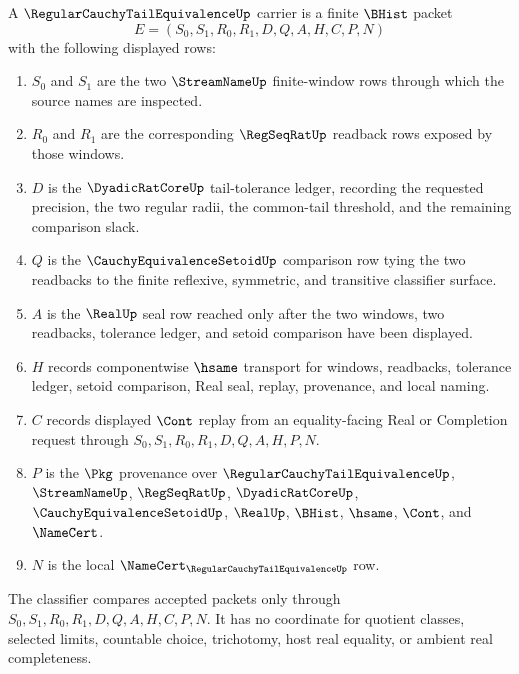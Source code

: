 \begin{definition}
\label{def:regular-cauchy-tail-equivalence-carrier}
A $\RegularCauchyTailEquivalenceUp$ carrier is a finite $\BHist$ packet
$$
E=(S_0,S_1,R_0,R_1,D,Q,A,H,C,P,N)
$$
with the following displayed rows:
\begin{enumerate}
\item $S_0$ and $S_1$ are the two $\StreamNameUp$ finite-window rows through which the source names are inspected.
\item $R_0$ and $R_1$ are the corresponding $\RegSeqRatUp$ readback rows exposed by those windows.
\item $D$ is the $\DyadicRatCoreUp$ tail-tolerance ledger, recording the requested precision, the two regular radii, the common-tail threshold, and the remaining comparison slack.
\item $Q$ is the $\CauchyEquivalenceSetoidUp$ comparison row tying the two readbacks to the finite reflexive, symmetric, and transitive classifier surface.
\item $A$ is the $\RealUp$ seal row reached only after the two windows, two readbacks, tolerance ledger, and setoid comparison have been displayed.
\item $H$ records componentwise $\hsame$ transport for windows, readbacks, tolerance ledger, setoid comparison, Real seal, replay, provenance, and local naming.
\item $C$ records displayed $\Cont$ replay from an equality-facing Real or Completion request through $S_0,S_1,R_0,R_1,D,Q,A,H,P,N$.
\item $P$ is the $\Pkg$ provenance over $\RegularCauchyTailEquivalenceUp$, $\StreamNameUp$, $\RegSeqRatUp$, $\DyadicRatCoreUp$, $\CauchyEquivalenceSetoidUp$, $\RealUp$, $\BHist$, $\hsame$, $\Cont$, and $\NameCert$.
\item $N$ is the local $\NameCert_{\RegularCauchyTailEquivalenceUp}$ row.
\end{enumerate}
The classifier compares accepted packets only through $S_0,S_1,R_0,R_1,D,Q,A,H,C,P,N$. It has no coordinate for quotient classes, selected limits, countable choice, trichotomy, host real equality, or ambient real completeness.
\end{definition}

